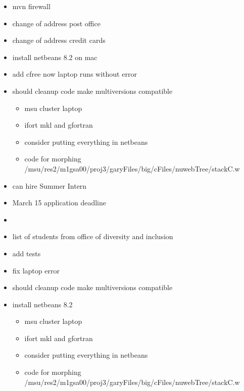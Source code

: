 \documentclass[hyperref]{labbook}
\begin{document}
\begin{itemize}
\item mvn firewall
\item change of address post office
\item change of address credit cards 
\item install netbeans 8.2 on mac
\end{itemize}




\begin{itemize}
\item add cfree now laptop runs without error
\item should cleanup code make multiversions compatible
  \begin{itemize}
  \item  msu cluster laptop
  \item ifort mkl and  gfortran
  \item consider putting everything in netbeans
  \item code for morphing /msu/res2/m1gsa00/proj3/garyFiles/big/cFiles/nuwebTree/stackC.w
  \end{itemize}
\end{itemize}


\begin{itemize}
\item can hire Summer Intern
\item March 15 application deadline
\item 
\item list of students from office of diversity and inclusion
\end{itemize}







\begin{itemize}
\item add tests
\item fix laptop error
\item should cleanup code make multiversions compatible
\item install netbeans 8.2
  \begin{itemize}
  \item  msu cluster laptop
  \item ifort mkl and  gfortran
  \item consider putting everything in netbeans
  \item code for morphing /msu/res2/m1gsa00/proj3/garyFiles/big/cFiles/nuwebTree/stackC.w
  \end{itemize}
\end{itemize}
\end{document}
